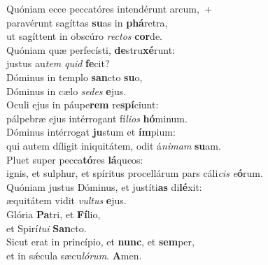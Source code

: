 \evenverse Quóniam ecce peccatóres intendérunt arcum,~+\\\evenverse  paravérunt sagíttas \textbf{su}as in \textbf{phá}retra,~\*\\
\evenverse ut sagíttent in obscúro \textit{re}\textit{ctos} \textbf{cor}de.\\
\oddverse Quóniam quæ perfecísti, \textbf{de}stru\textbf{xé}runt:~\*\\
\oddverse justus au\textit{tem} \textit{quid} \textbf{fe}cit?\\
\evenverse Dóminus in templo \textbf{san}cto \textbf{su}o,~\*\\
\evenverse Dóminus in cælo \textit{se}\textit{des} \textbf{e}jus.\\
\oddverse Oculi ejus in páupe\textbf{rem} re\textbf{spí}ciunt:~\*\\
\oddverse pálpebræ ejus intérrogant fí\textit{li}\textit{os} \textbf{hó}minum.\\
\evenverse Dóminus intérrogat \textbf{ju}stum et \textbf{ím}pium:~\*\\
\evenverse qui autem díligit iniquitátem, odit á\textit{ni}\textit{mam} \textbf{su}am.\\
\oddverse Pluet super pecca\textbf{tó}res \textbf{lá}queos:~\*\\
\oddverse ignis, et sulphur, et spíritus procellárum pars cáli\textit{cis} \textit{e}\textbf{ó}rum.\\
\evenverse Quóniam justus Dóminus, et justíti\textbf{as} di\textbf{lé}xit:~\*\\
\evenverse æquitátem vidit \textit{vul}\textit{tus} \textbf{e}jus.\\
\oddverse Glória \textbf{Pa}tri, et \textbf{Fí}lio,~\*\\
\oddverse et Spirí\textit{tu}\textit{i} \textbf{San}cto.\\
\evenverse Sicut erat in princípio, et \textbf{nunc}, et \textbf{sem}per,~\*\\
\evenverse et in sǽcula sæcu\textit{ló}\textit{rum}. \textbf{A}men.\\
